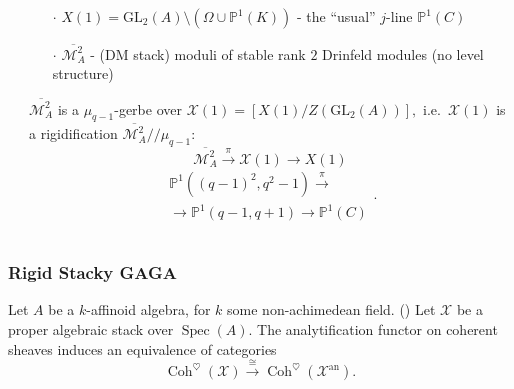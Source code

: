 \documentclass[handout]{beamer}
\numberwithin{equation}{section}
\numberwithin{case}{theorem}
\newcommand{\cH}{\mathcal{H}}		%
\newcommand{\cM}{\mathcal{M}}		%
\newcommand{\sX}{\mathscr{X}}		%
\newcommand{\bbP}{\mathbb{P}}		%
\newcommand{\bbQ}{\mathbb{Q}}		%
\newcommand{\bbZ}{\mathbb{Z}}		%
\newcommand{\GL}{\mathrm{GL}} 	%
\newcommand{\PSL}{\mathrm{PSL}} 	%
\newcommand{\Spec}{\operatorname{Spec}} %
\newcommand{\<}{\left\langle}
\renewcommand{\>}{\right\rangle}
\begin{document}
\begin{frame}
\begin{columns}
\begin{column}{.5\textwidth}
			\end{column}
			\pause
			\begin{column}{.5\textwidth}
				\begin{example}
					\begin{itemize}
						\item[$\cdot$] $X(1)=\GL_2(A)\setminus(\Omega\cup\bbP^1(K))$ - the ``usual'' $j$-line $\bbP^1(C)$ \pause
						\item[$\cdot$] $\overline{\cM^2_A}$ - (DM stack) moduli of stable rank $2$ Drinfeld modules (no level structure) \pause
					\end{itemize}
					$\overline{\cM^2_A}$ is a $\mu_{q-1}$-gerbe over $\sX(1)=[X(1)/Z(\GL_2(A))],$ \pause i.e.\ $\sX(1)$ is a rigidification $\overline{\cM^2_A}/\!/\mu_{q-1}$: \pause
					\[\overline{\cM^2_A}\overset{\pi}{\to}\sX(1)\to X(1)\] \pause
					\[\begin{array}{ll}
						\bbP^1((q-1)^2,q^2-1)\overset{\pi}{\to}\\\to\bbP^1(q-1,q+1)\to \bbP^1(C)\end{array}.
					\]
				\end{example}
			\end{column}
		\end{columns}
	\end{frame}
	
	\begin{frame}
		\frametitle{Rigid Stacky GAGA}
		
		\begin{theorem} Let $A$ be a $k$-affinoid algebra, for $k$ some non-achimedean field. 
				(\cite[Theorem $7.4$]{Porta-Yu-Higher-analytic-stacks-GAGA}) Let $\sX$ be a proper algebraic stack over $\Spec(A).$ \pause The analytification functor on coherent sheaves induces an equivalence of categories \pause
				\[\operatorname{Coh}^{\heartsuit}(\sX)\overset{\cong}{\to} \operatorname{Coh}^{\heartsuit}(\sX^{\text{an}}).\] 
		\end{theorem}
	\end{frame}
	
\end{document}
